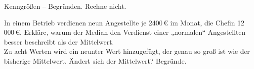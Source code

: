 \begin{aufgabe}{Kenngrößen -- Begründen. Rechne nicht.}
\begin{teile}
\teil In einem Betrieb verdienen neun Angestellte je 2400\,€ im Monat, die Chefin 12\,000\,€. Erkläre, warum der Median den Verdienst einer „normalen“ Angestellten besser beschreibt als der Mittelwert. \\[12pt]
\teil Zu acht Werten wird ein neunter Wert hinzugefügt, der genau so groß ist wie der bisherige Mittelwert. Ändert sich der Mittelwert? Begründe. \\[12pt]
\end{teile}
\end{aufgabe}
